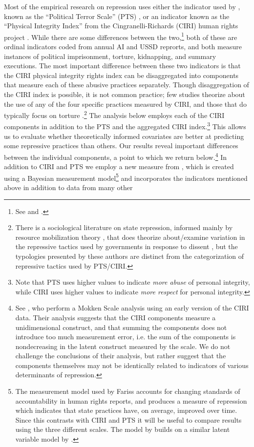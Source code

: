 \documentclass[11pt]{article}
\begin{document}
Most of the empirical research on repression uses either the indicator used by \citet{PoeTate1994}, known as the ``Political Terror Scale'' (PTS) \citep{GibneyCornettWood2009}, or an indicator known as the ``Physical Integrity Index'' from the Cingranelli-Richards (CIRI) human rights project \citep{CIRI2010}. While there are some differences between the two,\footnote{See \citet{WoodGibney2010} and \citet{CingranelliRichards2010}.} both of these are ordinal indicators coded from annual AI and USSD reprorts, and both measure instances of political imprisonment, torture, kidnapping, and summary executions. The most important difference between these two indicators is that the CIRI physical integrity rights index can be disaggregated into components that measure each of these abusive practices separately. Though disaggregation of the CIRI index is possible, it is not common practice; few studies theorize about the use of any of the four specific practices measured by CIRI, and those that do typically focus on torture \citep[See, e.g.][]{Hathaway2004,Rejali2007,ConradMoore2010,Conrad2012,ConradRitter2013}.\footnote{There is a sociological literature on state repression, informed mainly by resource mobilization theory \citep[See, e.g.][]{Tilly1978}, that does theorize about/examine variation in the repressive tactics used by governments in response to dissent \citep[See, e.g.][]{DellaPorta1996,Earl2003,Boykoff2007}, but the typologies presented by these authors are distinct from the categorization of repressive tactics used by PTS/CIRI.} The analysis below employs each of the CIRI components in addition to the PTS and the aggregated CIRI index.\footnote{Note that PTS uses higher values to indicate {\em more abuse} of personal integrity, while CIRI uses higher values to indicate {\em more respect} for personal integrity.} This allows us to evaluate whether theoretically informed covariates are better at predicting some repressive practices than others. Our results reveal important differences between the individual components, a point to which we return below.\footnote{See \citet{CingranelliRichards1999isq}, who perform a Mokken Scale analysis using an early version of the CIRI data. Their analysis suggests that the CIRI components measure a unidimensional construct, and that summing the components does not introduce too much measurement error, i.e. the sum of the components is nondecreasing in the latent construct measured by the scale. We do not challenge the conclusions of their analysis, but rather suggest that the components themselves may not be identically related to indicators of various determinants of repression.} In addition to CIRI and PTS we employ a new measure from \citet{Fariss2013}, which is created using a Bayesian measurement model\footnote{The measurement model used by Fariss accounts for changing standards of accountability in human rights reports, and produces a measure of repression which indicates that state practices have, on average, improved over time. Since this contrasts with CIRI and PTS it will be useful to compare results using the three different scales. The model by \citeauthor{Fariss2013} builds on a similar latent variable model by \citet{FarissSchnakenberg2011}.} and incorporates the indicators mentioned above in addition to data from many other 
\end{document}
